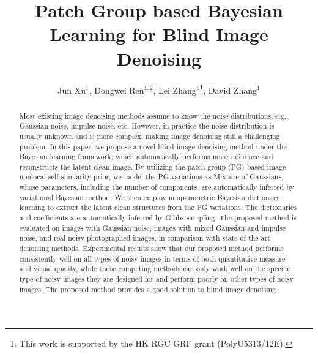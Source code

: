 \documentclass[runningheads]{llncs}
\begin{document}
\newcommand{\point}{
    \raise0.7ex\hbox{.}
    }


\pagestyle{headings}

\mainmatter

\title{Patch Group based Bayesian Learning for Blind Image Denoising} %


\author{Jun Xu$^{1}$, Dongwei Ren$^{1,2}$, Lei Zhang$^{1}$\footnote{This work is supported by the HK RGC GRF grant (PolyU5313/12E).}, David Zhang$^{1}$} %

\maketitle

\begin{abstract}
Most existing image denoising methods assume to know the noise distributions, e.g., Gaussian noise, impulse noise, etc. However, in practice the noise distribution is usually unknown and is more complex, making image denoising still a challenging problem. In this paper, we propose a novel blind image denoising method under the Bayesian learning framework, which automatically performs noise inference and reconstructs the latent clean image. By utilizing the patch group (PG) based image nonlocal self-similarity prior, we model the PG variations as Mixture of Gaussians, whose parameters, including the number of components, are automatically inferred by variational Bayesian method. We then employ nonparametric Bayesian dictionary learning to extract the latent clean structures from the PG variations. The dictionaries and coefficients are automatically inferred by Gibbs sampling. The proposed method is evaluated on images with Gaussian noise, images with mixed Gaussian and impulse noise, and real noisy photographed images, in comparison with state-of-the-art denoising methods. Experimental results show that our proposed method performs consistently well on all types of noisy images in terms of both quantitative measure and visual quality, while those competing methods can only work well on the specific type of noisy images they are designed for and perform poorly on other types of noisy images. The proposed method provides a good solution to blind image denoising.
\end{abstract}
\end{document}
